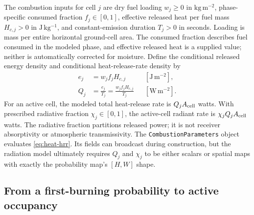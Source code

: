 \documentclass[11pt,a4paper]{article}
\begin{document}
The combustion inputs for cell $j$ are dry fuel loading $w_j\ge0$ in
$\mathrm{kg\,m^{-2}}$, phase-specific consumed fraction $f_j\in[0,1]$,
effective released heat per fuel mass $H_{c,j}>0$ in $\mathrm{J\,kg^{-1}}$, and
constant-emission duration $T_j>0$ in seconds. Loading is mass per entire
horizontal ground-cell area. The consumed fraction describes fuel consumed
in the modeled phase, and effective released heat is a supplied value; neither
is automatically corrected for moisture. Define the conditional released
energy density and conditional heat-release-rate density by
\begin{align}
 e_j&=w_jf_j H_{c,j}
       &&[\mathrm{J\,m^{-2}}],\\
 Q_j&=\frac{e_j}{T_j}=\frac{w_jf_j H_{c,j}}{T_j}
       &&[\mathrm{W\,m^{-2}}].
 \label{eq:heat-hrr}
\end{align}
For an active cell, the modeled total heat-release rate is
$Q_jA_{\rm cell}$ watts. With prescribed radiative fraction
$\chi_j\in[0,1]$, the active-cell radiant rate is
$\chi_j Q_j A_{\rm cell}$ watts. The radiative fraction partitions released
power; it is not receiver absorptivity or atmospheric transmissivity.
The \texttt{CombustionParameters} object evaluates
\eqref{eq:heat-hrr}. Its fields can broadcast during construction, but the
radiation model ultimately requires $Q_j$ and $\chi_j$ to be either scalars
or spatial maps with exactly the probability map's $[H,W]$ shape.

\subsection{From a first-burning probability to active occupancy}
\label{sec:heat-timing}
\end{document}
